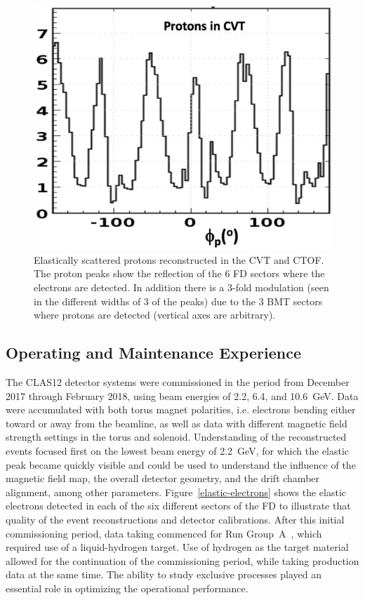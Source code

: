 \documentclass[final,3p,twocolumn]{elsarticle}
\begin{document}
\begin{figure}[ht]
\vspace{0.3cm}\centerline{\includegraphics[width=0.8\columnwidth]{CVT-elastic-protons.png}}
\caption{Elastically scattered protons reconstructed in the CVT and CTOF. The proton peaks show the reflection of
  the 6 FD sectors where the electrons are detected. In addition there is a 3-fold modulation (seen in the different
  widths of 3 of the peaks) due to the 3 BMT sectors where protons are detected (vertical axes are arbitrary).}
\label{CVT-elastic-protons}
\end{figure}

\subsection{Operating and Maintenance Experience}

The CLAS12 detector systems were commissioned in the period from December 2017 through February 2018, using
beam energies of 2.2, 6.4, and 10.6~GeV. Data were accumulated with both torus magnet polarities, i.e. electrons
bending either toward or away from the beamline, as well as data with different magnetic field strength settings
in the torus and solenoid. Understanding of the reconstructed events focused first on the lowest beam energy of
2.2~GeV, for which the elastic peak became quickly visible and could be used to understand the influence of the
magnetic field map, the overall detector geometry, and the drift chamber alignment, among other parameters.
Figure~\ref{elastic-electrons} shows the elastic electrons detected in each of the six different sectors of the FD
to illustrate that quality of the event reconstructions and detector calibrations. After this initial commissioning
period, data taking commenced for Run Group~A~\cite{rg-details}, which required use of a liquid-hydrogen target.
Use of hydrogen as the target material allowed for the continuation of the commissioning period, while taking
production data at the same time. The ability to study exclusive processes played an essential role in optimizing
the operational performance. 
\end{document}

